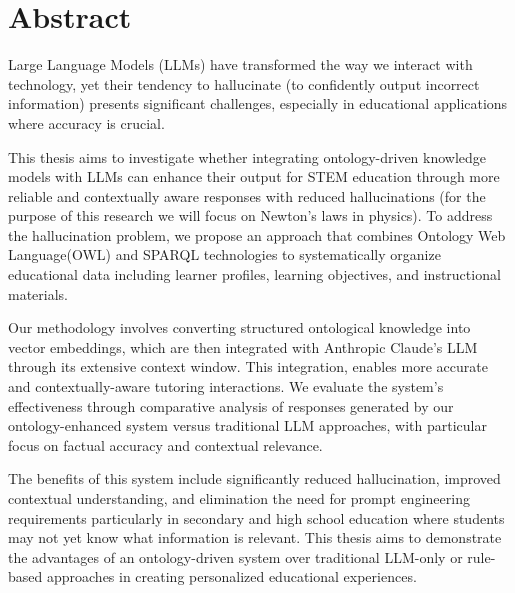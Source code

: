 
\section*{Abstract}

Large Language Models (LLMs) have transformed the way we interact with technology, 
yet their tendency to hallucinate (to confidently output incorrect information) presents significant challenges, especially in educational applications 
where accuracy is crucial.

This thesis aims to investigate whether integrating ontology-driven knowledge models with LLMs can enhance their output for STEM education through more 
reliable and contextually aware responses with reduced hallucinations (for the purpose of this research we will focus on Newton's laws in physics). To address the hallucination problem, we propose an approach that combines Ontology Web Language(OWL) and SPARQL technologies 
to systematically organize educational data including learner profiles, learning objectives, and instructional materials.

Our methodology involves converting structured ontological knowledge into vector embeddings, which are then integrated with Anthropic Claude's LLM through its extensive context window. 
This integration, enables more accurate and contextually-aware tutoring interactions. We evaluate the system's effectiveness 
through comparative analysis of responses generated by our ontology-enhanced system versus traditional LLM approaches, with particular focus on factual accuracy and contextual relevance.

The benefits of this system include significantly reduced hallucination, improved contextual understanding, and elimination the need for prompt engineering requirements particularly in
secondary and high school education where students may not yet know what information is relevant. This thesis aims to demonstrate the advantages of an ontology-driven 
system over traditional LLM-only or rule-based approaches in creating personalized educational experiences.

\newpage
